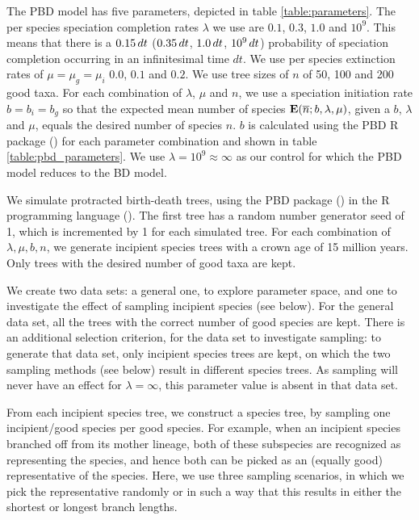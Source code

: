 
The PBD model has five parameters, depicted in table \ref{table:parameters}. 
The per species speciation completion rates $\lambda$ 
we use are $0.1$, $0.3$, $1.0$ and $10^9$. 
This means that there is a $0.15\thinspace dt$ 
($0.35\thinspace dt$, $1.0\thinspace dt$, $10^9\thinspace dt$) 
probability of speciation completion occurring in an infinitesimal time $dt$. 
We use per species extinction rates of $\mu = \mu_g = \mu_i$ $0.0$, $0.1$ and $0.2$.
We use tree sizes of $n$ of 50, 100 and 200 good taxa.
For each combination of $\lambda$, $\mu$ and $n$, 
we use a speciation initiation rate $b = b_i = b_g$ 
so that the expected mean number of species $\mathbf{E}(\overline{n}; b, \lambda, \mu)$,
given a $b$, $\lambda$ and $\mu$,
equals the desired number of species $n$.
$b$ is calculated using the PBD R package (\cite{pbd})
for each parameter combination and shown in table \ref{table:pbd_parameters}.
We use $\lambda = 10^9 \approx \infty$ 
as our control for which the PBD model reduces to the BD model.

We simulate protracted birth-death trees, using the PBD 
package (\cite{pbd}) in the R programming language (\cite{r}).
The first tree has a random number generator seed of 1, 
which is incremented by 1 for each simulated tree.
For each combination of ${\lambda, \mu, b, n}$, 
we generate incipient species trees with a crown age of 15 million years.
Only trees with the desired number of good taxa are kept.

We create two data sets: a general one, to explore parameter space, 
and one to investigate the effect of sampling incipient species (see below).
For the general data set, all the trees with the correct number of good species are kept.
There is an additional selection criterion, for the data set to investigate sampling:
to generate that data set, only incipient species trees are kept, 
on which the two sampling methods (see below) result in different species trees.
As sampling will never have an effect for $\lambda = \infty$, 
this parameter value is absent in that data set.

From each incipient species tree, we construct a species tree,
by sampling one incipient/good species per good species. 
For example, when an
incipient species branched off from its mother lineage, 
both of these subspecies are recognized as representing the species, 
and hence both can be picked as an (equally good) representative of the species. 
Here, we use three sampling scenarios,
in which we pick the representative randomly or in such a way that this
results in either the shortest or longest branch lengths. 

